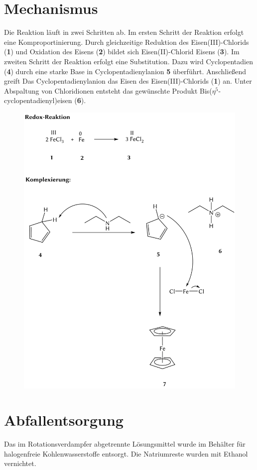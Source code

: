 \documentclass[12pt]{article}
\begin{document}
\begin{onehalfspace}
\section{Mechanismus\cite{wiberg}}
Die Reaktion läuft in zwei Schritten ab.
Im ersten Schritt der Reaktion erfolgt eine Komproportinierung. Durch gleichzeitige Reduktion des Eisen(III)-Chlorids (\textbf{1})
und Oxidation des Eisens (\textbf{2}) bildet sich Eisen(II)-Chlorid Eisens (\textbf{3}).
Im zweiten Schritt der Reaktion erfolgt eine Substitution. Dazu wird Cyclopentadien (\textbf{4}) durch eine starke Base in Cyclopentadienylanion \textbf{5} überführt. Anschließend greift Das Cyclopentadienylanion das Eisen des Eisen(III)-Chlorids (\textbf{1}) an. 
Unter Abspaltung von Chloridionen entsteht das gewünschte Produkt Bis($\eta^5$-cyclopentadienyl)eisen (\textbf{6}).
\begin{figure}[!ht]
   \centering
\includegraphics[width=\textwidth]{mechan.png}
\end{figure}
\section{Abfallentsorgung}
Das im Rotationsverdampfer abgetrennte Lösungsmittel wurde im Behälter für halogenfreie Kohlenwasserstoffe entsorgt.
Die Natriumreste wurden mit Ethanol vernichtet. 

\end{onehalfspace}
\end{document}
